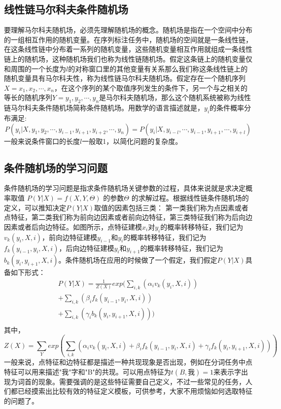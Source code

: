 \documentclass[twoside,a4paper,12pt]{book}%
\begin{document}
\subsection{线性链马尔科夫条件随机场}
要理解马尔科夫随机场，必须先理解随机场的概念。随机场是指在一个空间中分布的一组相互作用的随机变量。在序列标注任务中，随机场的空间就是一条线性链，在这条线性链中分布着一系列的随机变量，这些随机变量相互作用就组成一条线性链上的随机场，这种随机场我们也称为线性链随机场。假定这条链上的随机变量仅和周围的一个长度为$l$的对称窗口里的其他变量有关系那么我们称这条线性链上的随机变量具有马尔科夫性，称为线性链马尔科夫随机场。假定存在一个随机序列$X=x_1,x_2,\cdots,x_n$，在这个序列的某个取值序列发生的条件下，另一个与之相关的等长的随机序列$Y=y_1,y_2,\cdots,y_n$是马尔科夫随机场，那么这个随机系统被称为线性链马尔科夫条件随机场简称条件随机场。用数学的语言描述就是，$y_i$的条件概率分布满足:
$$
P(y_i|X,y_1,y_2,\cdots ,y_{i-1},y_{i+1},y_{i+2},\cdots ,y_n)=
P(y_i|X,y_{i-l},\cdots ,y_{i-1},y_{i+1},\cdots,y_{i+l})
$$
一般来说条件窗口的长度$l$一般取1，以简化问题的复杂度。
\subsection{条件随机场的学习问题}
条件随机场的学习问题是指求条件随机场关键参数的过程，具体来说就是求决定概率取值
$
P(Y|X)=f(X,Y,\Theta)
$
的参数$\Theta$ 的求解过程。根据线性链条件随机场的定义，可以推知决定$P(Y|X)$取值的因素包括三类：
第一类我们称为点因素或者点特征，第二类我们称为前向边因素或者前向边特征，第三类特征我们称为后向边因素或者后向边特征。如图所示，点特征建模$x_i$对$y_i$的概率转移特征，我们记为$v_k(y_i,X,i)$，前向边特征建模$y_{i-1}$和$y_{i}$的概率转移特征，我们记为$f_k(y_{i-1},y_i,X,i)$，后向边特征建模$y_{i}$和$y_{i+1}$的概率转移特征，我们记为$b_k(y_{i},y_{i+1},X,i)$。条件随机场在应用的时候做了一个假定，我们假定$P(Y|X)$具备如下形式：
$$
\begin{aligned}
P(Y|X)  =
\frac{1
}{
Z(X)
}
exp(\sum_{i,k}(\alpha _i v_k(y_i,X,i))\\
	+\sum_{i,k}(\beta _i f_k(y_{i-1},y_i, X,i))\\
	+\sum_{i,k}(\gamma _i b_k(y_{i},y_{i+1},X,i)))\\
\end{aligned}
$$
其中，
$$
Z(X) = \sum_{Y}exp(\sum_{i,k}(\alpha _i v_k(y_i,X,i)+\beta _i f_k(y_{i-1},y_i, X,i)+\gamma _if_k(y_{i},y_{i+1},X,i)))
$$
一般来说，点特征和边特征都是描述一种共现现象是否出现，例如在分词任务中点特征可以用来描述"我"字和"B"的共现。可以用点特征为$t(B,\text{我})=1$来表示字出现为词首的现象。需要强调的是这些特征需要自己定义，不过一些常见的任务，人们都已经摸索出比较有效的特征定义模板，可供参考，大家不用烦恼如何选取特征的问题了。
\end{document}
